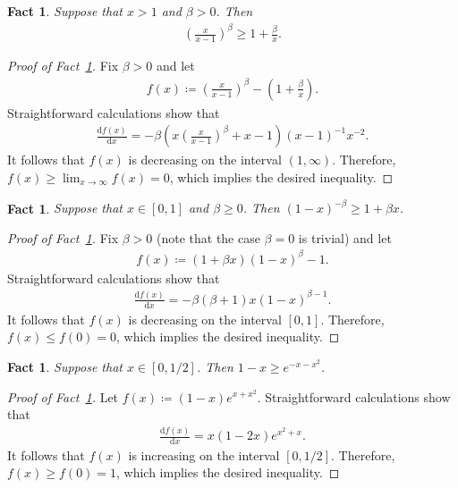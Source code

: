 \documentclass[11pt,a4paper]{article}
\newtheorem{fact}[definition]{Fact}
\begin{document}
\begin{fact}\label{FACT:inequality-c}
    Suppose that $x > 1$ and $\beta > 0$. Then 
    \begin{align*}
        \left(\frac{x}{x-1}\right)^{\beta} 
        \ge 1 + \frac{\beta}{x}. 
    \end{align*}
\end{fact}
\begin{proof}[Proof of Fact~\ref{FACT:inequality-c}]
    Fix $\beta > 0$ and let 
    \begin{align*}
        f(x) \coloneqq \left(\frac{x}{x-1}\right)^{\beta} - \left( 1 + \frac{\beta}{x} \right). 
    \end{align*}
    Straightforward calculations show that
    \begin{align*}
        \frac{\mathrm{d} f(x)}{\mathrm{d} x}
        = -\beta  \left(x \left(\frac{x}{x-1}\right)^{\beta }+x-1\right){(x-1)^{-1} x^{-2}}.  
    \end{align*}
    It follows that $f(x)$ is decreasing on the interval $(1, \infty)$. 
    Therefore, $f(x) \ge \lim_{x \to \infty} f(x) = 0$, which implies the desired inequality.
\end{proof}

\begin{fact}\label{FACT:inequality-a}
    Suppose that $x\in [0,1]$ and $\beta \ge 0$. Then 
    $\left(1-x\right)^{-\beta} \ge 1 + \beta x$. 
\end{fact}
\begin{proof}[Proof of Fact~\ref{FACT:inequality-a}]
    Fix $\beta > 0$ (note that the case $\beta = 0$ is trivial) and let 
    \begin{align*}
        f(x)
        \coloneqq (1+\beta x)(1-x)^{\beta} - 1. 
    \end{align*}
    Straightforward calculations show that
    \begin{align*}
        \frac{\mathrm{d} f(x)}{\mathrm{d} x}
        = - \beta  (\beta +1) x (1-x)^{\beta -1}. 
    \end{align*}
    It follows that $f(x)$ is decreasing on the interval $[0,1]$. 
    Therefore, $f(x) \le f(0) = 0$, which implies the desired inequality.
\end{proof}

\begin{fact}\label{FACT:inequality-b}
    Suppose that $x\in [0,1/2]$. Then 
    $1-x \ge e^{-x-x^2}$. 
\end{fact}
\begin{proof}[Proof of Fact~\ref{FACT:inequality-b}]
    Let $f(x) \coloneqq (1-x)e^{x+x^2}$. Straightforward calculations show that 
    \begin{align*}
        \frac{\mathrm{d} f(x)}{\mathrm{d} x} = x(1-2x)e^{x^2+x}. 
    \end{align*}
    It follows that $f(x)$ is increasing on the interval $[0, 1/2]$. 
    Therefore, $f(x) \ge f(0) = 1$, which implies the desired inequality.
\end{proof}
\end{document}
